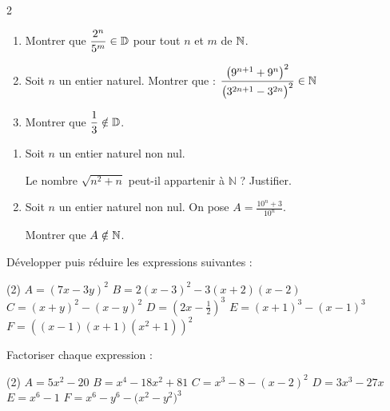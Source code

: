\documentclass[10pt, a4paper]{article}
\begin{document}
\begin{multicols*}{2}


\begin{Exercice}[][20 min][★★]
\begin{enumerate}
    \item Montrer que $\dfrac{2^n}{5^m} \in \mathbb{D}$ pour tout $n$ et $m$ de $\mathbb{N}$.
    \item Soit $n$ un entier naturel. Montrer que :
        $\dfrac{\big(9^{n+1}+9^n\big)^2}{\big(3^{2n+1}-3^{2n}\big)^2} \in \mathbb{N}$

    \item Montrer que $\dfrac{1}{3} \notin \mathbb{D}$.
    
\end{enumerate}
\end{Exercice}

\begin{Exercice}[][20 min][★★★]
\begin{enumerate}
    \item Soit $n$ un entier naturel non nul.
    
Le nombre $\sqrt{n^2 + n}$ peut-il appartenir à $\mathbb{N}$ ? Justifier.

    \item Soit $n$ un entier naturel non nul. On pose $A = \frac{10^n + 3}{10^n}$.

    Montrer que $A \notin \mathbb{N}$.
    
\end{enumerate}
\end{Exercice}

\begin{Exercice}[][20 min][★★]
Développer puis réduire les expressions suivantes :
    \begin{tasks}[label=$\bullet$, label-width=5pt, item-indent=15pt](2)
        \task $A = (7x-3y)^2$
        \task $B = 2(x - 3)^2 - 3(x + 2)(x - 2)$
        \task $C=(x+y)^2-(x-y)^2$
        \task $D = \left(2x - \frac{1}{2}\right)^3$
        \task $E = (x + 1)^3 - (x - 1)^3$
        \task $F = \left((x - 1)(x+1)(x^2 + 1)\right)^2$
    \end{tasks}
\end{Exercice}


\begin{Exercice}[][20 min][★★]
Factoriser chaque expression :
    \begin{tasks}[label=$\bullet$, label-width=5pt, item-indent=15pt](2)
        \task $A = 5x^2 - 20$
        \task $B = x^4 - 18x^2 + 81$
        \task $C = x^3 - 8 - (x - 2)^2$
        \task $D = 3x^3 - 27x$
        \task $E = x^6 - 1$
        \task $F = x^6 - y^6 - \big(x^2 - y^2\big)^3$
    \end{tasks}
\end{Exercice}



\end{multicols*}
\end{document}
